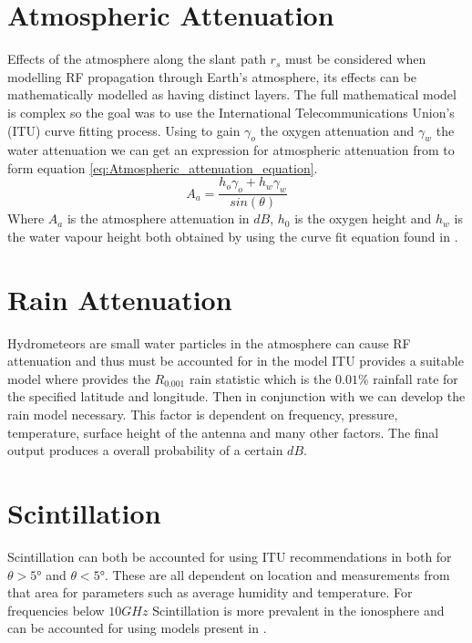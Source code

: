 \documentclass[conference]{IEEEtran}
\begin{document}
\section{Atmospheric Attenuation}
Effects of the atmosphere along the slant path $r_s$ must be considered when modelling RF propagation through Earth's atmosphere, its effects can be mathematically modelled as having distinct layers. The full mathematical model is complex so the goal was to use the International Telecommunications Union's (ITU) curve fitting process. Using \cite{ITU-R_P.676-5} to gain $\gamma_{o}$ the oxygen attenuation and $\gamma_w$ the water attenuation we can get an expression for atmospheric attenuation from \cite{ITU-R_P.618-7} to form equation \ref{eq:Atmospheric_attenuation_equation}.
\begin{equation}
A_a = \frac{h_o \gamma_o + h_w \gamma_w}{sin(\theta)}
\label{eq:Atmospheric_attenuation_equation}
\end{equation}
Where $A_a$ is the atmosphere attenuation in $dB$, $h_0$ is the oxygen height and $h_w$ is the water vapour height both obtained by using the curve fit equation found in \cite{ITU-R_P.618-7}.

\label{sec:Atmosphere}

\section{Rain Attenuation}
Hydrometeors are small water particles in the atmosphere can cause RF attenuation and thus must be accounted for in the model ITU provides a suitable model where \cite{ITU-R_P.837-1} provides the $R_{0.001}$ rain statistic which is the $0.01\%$ rainfall rate for the specified latitude and longitude. Then in conjunction with \cite{ITU-R_P.618-7} we can develop the rain model necessary. This factor is dependent on frequency, pressure, temperature, surface height of the antenna and many other factors. The final output produces a overall probability of a certain $dB$.\\

\label{sec:Rain}


\section{Scintillation}
Scintillation can both be accounted for using ITU recommendations in \cite{ITU-R_P.618-7} both for $\theta> 5°$ and $\theta < 5°$. These are all dependent on location and measurements from that area for parameters such as average humidity and temperature. For frequencies below $10G Hz$ Scintillation is more prevalent in the ionosphere and can be accounted for using models present in \cite{ITU-R_P.531-14}.\\ 
\end{document}
